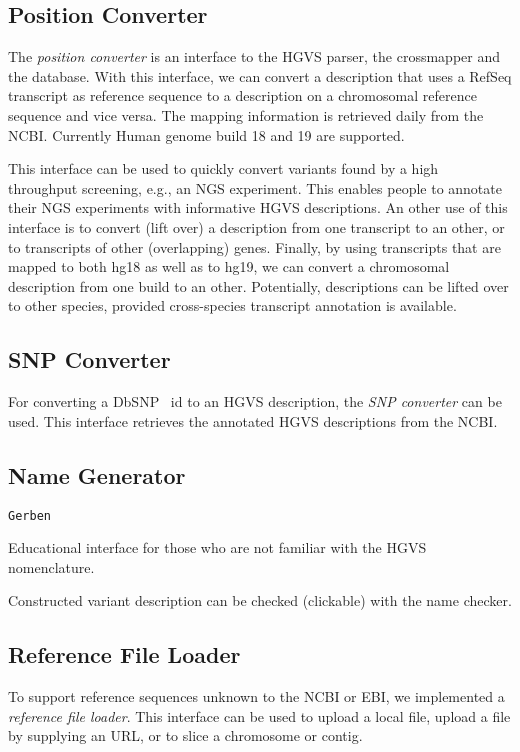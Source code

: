 \documentclass{article}
\begin{document}
\subsection{Position Converter}
The \emph{position converter} is an interface to the HGVS parser, the
cross\-mapper and the database. With this interface, we can convert a
description that uses a RefSeq transcript as reference sequence to a
description on a chromosomal reference sequence and vice versa. The mapping
information is retrieved daily from the NCBI. Currently Human genome build 18
and 19 are supported.

This interface can be used to quickly convert variants found by a high
throughput screening, e.g., an NGS experiment. This enables people to annotate
their NGS experiments with informative HGVS descriptions. An other use of this
interface is to convert (lift over) a description from one transcript to an
other, or to transcripts of other (overlapping) genes. Finally, by using
transcripts that are mapped to both hg18 as well as to hg19, we can convert a
chromosomal description from one build to an other. Potentially, descriptions
can be lifted over to other species, provided cross-species transcript
annotation is available.

\subsection{SNP Converter}
For converting a DbSNP~\cite{DBSNP} id to an HGVS description, the \emph{SNP
converter} can be used. This interface retrieves the annotated HGVS
descriptions from the NCBI.

\subsection{Name Generator}
\texttt{Gerben}

Educational interface for those who are not familiar with the HGVS
nomenclature.

Constructed variant description can be checked (clickable) with the name
checker.

\subsection{Reference File Loader}
To support reference sequences unknown to the NCBI or EBI, we implemented a
\emph{reference file loader}. This interface can be used to upload a local
file, upload a file by supplying an URL, or to slice a chromosome or contig.
\end{document}
